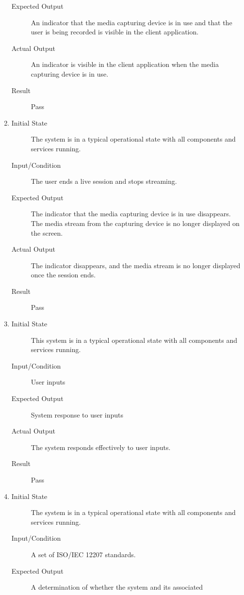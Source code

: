 \documentclass[12pt, titlepage]{article}
\begin{document}
\begin{enumerate}[NFR-T1]
\begin{description}
    \item[Expected Output] An indicator that the media capturing device is in use
      and that the user is being recorded is visible in the client application.
    \item[Actual Output] An indicator is visible in the client application when the
      media capturing device is in use.
    \item[Result] Pass
    \end{description}
  \item \label{NFRT26}
    \begin{description}
    \item[Initial State] The system is in a typical operational state with all
      components and services running.
    \item[Input/Condition] The user ends a live session and stops streaming.
    \item[Expected Output] The indicator that the media capturing device is in use
      disappears. The media stream from the capturing device is no longer
      displayed on the screen.
    \item[Actual Output] The indicator disappears, and the media stream is no
      longer displayed once the session ends.
    \item[Result] Pass
    \end{description}
  \item \label{NFRT27}
    \begin{description}
    \item[Initial State] This system is in a typical operational state with all
      components and services running.
    \item[Input/Condition] User inputs
    \item[Expected Output] System response to user inputs
    \item[Actual Output] The system responds effectively to user inputs.
    \item[Result] Pass
    \end{description}
  \item \label{NFRT28}
    \begin{description}
    \item[Initial State] The system is in a typical operational state with all
      components and services running.
    \item[Input/Condition] A set of ISO/IEC 12207 standards.
    \item[Expected Output] A determination of whether the system and its associated

\end{description}
\end{enumerate}
\end{document}
